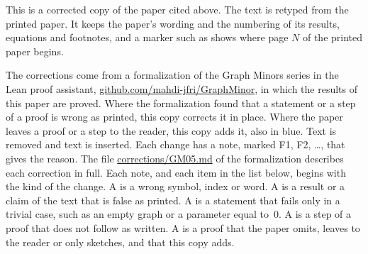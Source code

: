
This is a corrected copy of the paper cited above. The text is retyped from the printed paper.
It keeps the paper's wording and the numbering of its results, equations and footnotes, and a
marker such as  shows where page $N$ of the printed paper begins.

The corrections come from a formalization of the Graph Minors series in the Lean proof
assistant, \href{https://github.com/mahdi-jfri/GraphMinor}{github.com/mahdi-jfri/GraphMinor},
in which the results of this paper are proved. Where the formalization found that a statement
or a step of a proof is wrong as printed, this copy corrects it in place. Where the paper leaves a proof or a step to the reader, this copy adds it, also in blue. Text  is removed and text  is inserted. Each change has a note, marked
\textcolor{fixcolor}{\sffamily F1}, \textcolor{fixcolor}{\sffamily F2}, \dots, that gives the
reason. The file
\href{https://github.com/mahdi-jfri/GraphMinor/blob/main/corrections/GM05.md}{corrections/GM05.md}
of the formalization describes each correction in full. Each note, and each item in the list below, begins with the kind of the change. A  is a wrong symbol, index or word. A  is a result or a claim of the text that is false as printed. A  is a statement that fails only in a trivial case, such as an empty graph or a parameter equal to~$0$. A  is a step of a proof that does not follow as written. A  is a proof that the paper omits, leaves to the reader or only sketches, and that this copy adds.


